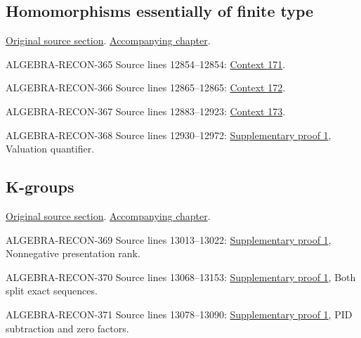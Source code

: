 \subsection{Homomorphisms essentially of finite type}
\hypertarget{algebra-source-section-essentially-of-finite-type}{}
\noindent\href{https://github.com/stacks/stacks-project/blob/a04446e57ec1fbc252a871afcec7752fb2807b14/algebra.tex\#L12829}{Original source section}. \href{algebra.pdf\#nameddest=section-essentially-of-finite-type}{Accompanying chapter}.

\begin{AlgebraSourceRoutes}
\item[ALGEBRA-RECON-365] Source lines 12854--12854: \hyperlink{algebra-context-171}{Context 171}.
\item[ALGEBRA-RECON-366] Source lines 12865--12865: \hyperlink{algebra-context-172}{Context 172}.
\item[ALGEBRA-RECON-367] Source lines 12883--12923: \hyperlink{algebra-context-173}{Context 173}.
\item[ALGEBRA-RECON-368] Source lines 12930--12972: \hyperlink{algebra_localization_kgroups_graded_notes_20260927}{Supplementary proof 1}, Valuation quantifier.
\end{AlgebraSourceRoutes}

\subsection{K-groups}
\hypertarget{algebra-source-section-K-groups}{}
\noindent\href{https://github.com/stacks/stacks-project/blob/a04446e57ec1fbc252a871afcec7752fb2807b14/algebra.tex\#L12995}{Original source section}. \href{algebra.pdf\#nameddest=section-K-groups}{Accompanying chapter}.

\begin{AlgebraSourceRoutes}
\item[ALGEBRA-RECON-369] Source lines 13013--13022: \hyperlink{algebra_localization_kgroups_graded_notes_20260927}{Supplementary proof 1}, Nonnegative presentation rank.
\item[ALGEBRA-RECON-370] Source lines 13068--13153: \hyperlink{algebra_localization_kgroups_graded_notes_20260927}{Supplementary proof 1}, Both split exact sequences.
\item[ALGEBRA-RECON-371] Source lines 13078--13090: \hyperlink{algebra_localization_kgroups_graded_notes_20260927}{Supplementary proof 1}, PID subtraction and zero factors.
\end{AlgebraSourceRoutes}

